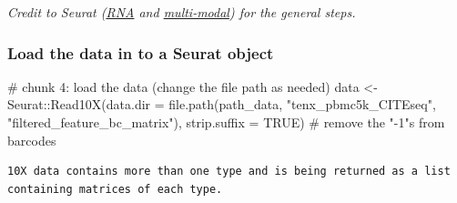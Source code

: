 \documentclass[
  letterpaper,
  DIV=11,
  numbers=noendperiod]{scrartcl}
\newenvironment{Shaded}{\begin{snugshade}}{\end{snugshade}}
\newcommand{\AttributeTok}[1]{\textcolor[rgb]{0.40,0.45,0.13}{#1}}
\newcommand{\CommentTok}[1]{\textcolor[rgb]{0.37,0.37,0.37}{#1}}
\newcommand{\ConstantTok}[1]{\textcolor[rgb]{0.56,0.35,0.01}{#1}}
\newcommand{\DocumentationTok}[1]{\textcolor[rgb]{0.37,0.37,0.37}{\textit{#1}}}
\newcommand{\FunctionTok}[1]{\textcolor[rgb]{0.28,0.35,0.67}{#1}}
\newcommand{\NormalTok}[1]{\textcolor[rgb]{0.00,0.23,0.31}{#1}}
\newcommand{\OtherTok}[1]{\textcolor[rgb]{0.00,0.23,0.31}{#1}}
\newcommand{\SpecialCharTok}[1]{\textcolor[rgb]{0.37,0.37,0.37}{#1}}
\newcommand{\StringTok}[1]{\textcolor[rgb]{0.13,0.47,0.30}{#1}}
\begin{document}
\emph{Credit to Seurat
(\href{https://satijalab.org/seurat/articles/pbmc3k_tutorial.html}{RNA}
and
\href{https://satijalab.org/seurat/articles/multimodal_vignette.html\#setup-a-seurat-object-add-the-rna-and-protein-data}{multi-modal})
for the general steps.}

\hypertarget{load-the-data-in-to-a-seurat-object}{%
\subsubsection{Load the data in to a Seurat
object}\label{load-the-data-in-to-a-seurat-object}}

\begin{Shaded}
\begin{Highlighting}[]
\CommentTok{\# chunk 4: load the data (change the file path as needed)}
\NormalTok{data }\OtherTok{\textless{}{-}}\NormalTok{ Seurat}\SpecialCharTok{::}\FunctionTok{Read10X}\NormalTok{(}\AttributeTok{data.dir =} \FunctionTok{file.path}\NormalTok{(path\_data, }\StringTok{"tenx\_pbmc5k\_CITEseq"}\NormalTok{,                                        }\StringTok{"filtered\_feature\_bc\_matrix"}\NormalTok{),}
                        \AttributeTok{strip.suffix =} \ConstantTok{TRUE}\NormalTok{) }\CommentTok{\# remove the "{-}1"s from barcodes}
\end{Highlighting}
\end{Shaded}

\begin{verbatim}
10X data contains more than one type and is being returned as a list containing matrices of each type.
\end{verbatim}

\begin{Shaded}
\end{Shaded}
\end{document}
